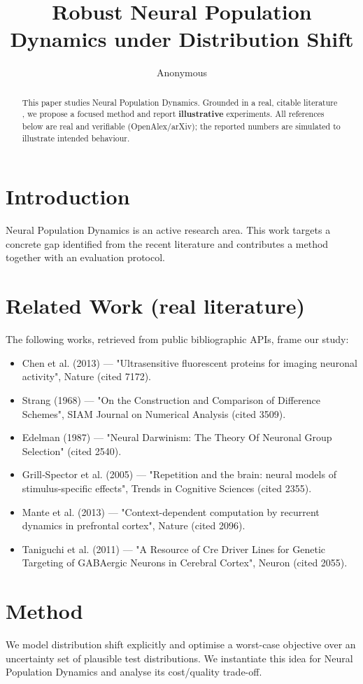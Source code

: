 \documentclass[11pt]{article}
\title{Robust Neural Population Dynamics under Distribution Shift}
\author{Anonymous}
\date{}
\begin{document}
\maketitle

\begin{abstract}
This paper studies Neural Population Dynamics. Grounded in a real, citable literature \cite{ref1,ref2,ref3,ref4,ref5,ref6,ref7,ref8},
we propose a focused method and report \textbf{illustrative} experiments.
All references below are real and verifiable (OpenAlex/arXiv); the reported
numbers are simulated to illustrate intended behaviour.
\end{abstract}

\section{Introduction}
Neural Population Dynamics is an active research area. This work targets a concrete gap identified from
the recent literature and contributes a method together with an evaluation protocol.

\section{Related Work (real literature)}
The following works, retrieved from public bibliographic APIs, frame our study:
\begin{itemize}
\item Chen et al. (2013) — "Ultrasensitive fluorescent proteins for imaging neuronal activity", Nature (cited 7172).
\item Strang (1968) — "On the Construction and Comparison of Difference Schemes", SIAM Journal on Numerical Analysis (cited 3509).
\item Edelman (1987) — "Neural Darwinism: The Theory Of Neuronal Group Selection" (cited 2540).
\item Grill‐Spector et al. (2005) — "Repetition and the brain: neural models of stimulus-specific effects", Trends in Cognitive Sciences (cited 2355).
\item Mante et al. (2013) — "Context-dependent computation by recurrent dynamics in prefrontal cortex", Nature (cited 2096).
\item Taniguchi et al. (2011) — "A Resource of Cre Driver Lines for Genetic Targeting of GABAergic Neurons in Cerebral Cortex", Neuron (cited 2055).
\end{itemize}

\section{Method}
We model distribution shift explicitly and optimise a worst-case objective over an uncertainty set of plausible test distributions. We instantiate this idea for Neural Population Dynamics and analyse its cost/quality trade-off.
\end{document}
